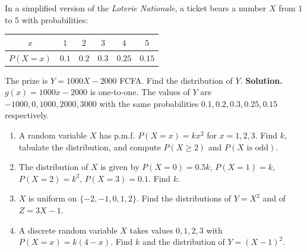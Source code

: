 \documentclass[11pt]{article}
\begin{document}
\begin{exemplebox}
In a simplified version of the \emph{Loterie Nationale}, a ticket bears a number $X$ from $1$ to $5$ with probabilities:
\begin{center}
\begin{tabular}{|c|ccccc|}
\hline
\rowcolor{popblueL} $x$ & $1$ & $2$ & $3$ & $4$ & $5$ \\ \hline
$P(X = x)$ & $0.1$ & $0.2$ & $0.3$ & $0.25$ & $0.15$ \\ \hline
\end{tabular}
\end{center}
The prize is $Y = 1000X - 2000$ FCFA. Find the distribution of $Y$.
\textbf{Solution.} $g(x) = 1000x - 2000$ is one-to-one. The values of $Y$ are $-1000, 0, 1000, 2000, 3000$ with the same probabilities $0.1, 0.2, 0.3, 0.25, 0.15$ respectively.
\end{exemplebox}

\begin{exercice}[Practice]
\begin{enumerate}
\item A random variable $X$ has p.m.f. $P(X = x) = kx^2$ for $x = 1, 2, 3$. Find $k$, tabulate the distribution, and compute $P(X \geq 2)$ and $P(X \text{ is odd})$.
\item The distribution of $X$ is given by $P(X = 0) = 0.5k$, $P(X = 1) = k$, $P(X = 2) = k^2$, $P(X = 3) = 0.1$. Find $k$.
\item $X$ is uniform on $\{-2, -1, 0, 1, 2\}$. Find the distributions of $Y = X^2$ and of $Z = 3X - 1$.
\item A discrete random variable $X$ takes values $0, 1, 2, 3$ with $P(X = x) = k(4-x)$. Find $k$ and the distribution of $Y = (X-1)^2$.
\end{enumerate}
\end{exercice}
\end{document}
